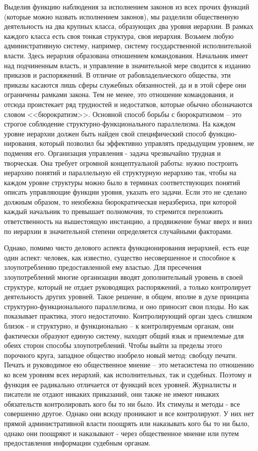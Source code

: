 \documentclass{book}
\begin{document}
Выделив функцию наблюдения за исполнением законов из всех прочих функций (которые можно назвать исполнением законов), мы разделили общественную деятельность на два крупных класса, образующих два уровня иерархии. В рамках каждого класса есть своя тонкая структура, своя иерархия. Возьмем любую административную систему, например, си­стему государственной исполнительной власти. Здесь иерархия образована отношением командования. Начальник имеет над подчиненным власть, и управление в значительной мере сво­дится к изданию приказов и распоряжений. В отличие от рабо­владельческого общества, эти приказы касаются лишь сферы служебных обязанностей, да и в этой сфере они ограничены рамками закона. Тем не менее, это отношение командования, и отсюда проистекает ряд трудностей и недостатков, которые обычно обозначаются словом <<бюрократизм>>. Основной способ борьбы с бюрократизмом -- это строгое соблюдение структур­но-функционального параллелизма. На каждом уровне иерар­хии должен быть найден свой специфический способ 
функцио­нирования, который позволил бы эффективно управлять преды­дущим уровнем, не подменяя его. Организация управления - задача чрезвычайно трудная и творческая. Она требует огром­ной концептуальной работы: нужно построить иерархию поня­тий и параллельную ей структурную иерархию так, чтобы на каждом уровне структуры можно было в терминах соответствующих понятий описать управляющие функции уровня, ука­зать его задачи. Если это не сделано должным образом, то неиз­бежна бюрократическая неразбериха, при которой каждый на­чальник то превышает полномочия, то стремится переложить ответственность на вышестоящую инстанцию, а продвижение бумаг вверх и вниз по иерархии в значительной степени опре­деляется случайными факторами.

Однако, помимо чисто делового аспекта функционирования иерархией, есть еще один аспект: человек, как известно, сущест­во несовершенное и способное к злоупотреблению предостав­ленной ему властью. Для пресечения злоупотреблений многие организации вводят дополнительный уровень в своей структу­ре, который не отдает руководящих распоряжений, а только контролирует деятельность других уровней. Такое решение, в общем, вполне в духе принципа структурно-функционально­го параллелизма, и оно приносит свои плоды. Но как показы­вает практика, этого недостаточно. Контролирующий орган здесь слишком близок - и структурно, и функционально -- к контролируемым органам, они фактически образуют единую систему, находят общий язык и приемлемые для обеих сто­рон способы злоупотреблений. Чтобы выйти за пределы этого порочного круга, западное общество изобрело новый метод: свободу печати. Печать и руководимое ею общественное мнение -- это метасистема  по отношению ко всем уровням всех иерархий, как исполнительных, так и судебных. 
Поэтому и функция ее радикально отличается от функций всех уровней. Журналисты и писатели не отдают никаких приказаний, они также не имеют никаких обязательств контролировать кого бы то ни было. Их стимулы и методы - все совершенно другое. Однако они всюду проникают и все контролируют. У них нет прямой административной власти поощрять или наказывать кого бы то ни было, однако они поощряют и наказывают - че­рез общественное мнение или путем предоставления информа­ции судебным органам.
\end{document}
